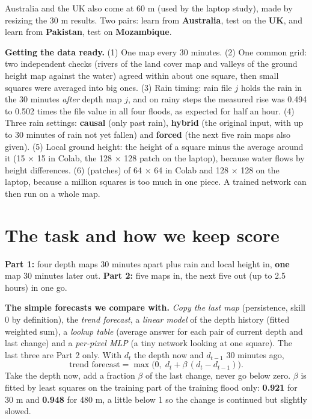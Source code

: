 Australia and the UK also come at 60 m (used by the laptop study), made by resizing the 30 m results. Two pairs: learn from \textbf{Australia}, test on the \textbf{UK}, and learn from \textbf{Pakistan}, test on \textbf{Mozambique}.

\textbf{Getting the data ready.} (1) One map every 30 minutes. (2) One common grid: two independent checks (rivers of the land cover map and valleys of the ground height map against the water) agreed within about one square, then small squares were averaged into big ones. (3) Rain timing: rain file $j$ holds the rain in the 30 minutes \emph{after} depth map $j$, and on rainy steps the measured rise was 0.494 to 0.502 times the file value in all four floods, as expected for half an hour. (4) Three rain settings: \textbf{causal} (only past rain), \textbf{hybrid} (the original input, with up to 30 minutes of rain not yet fallen) and \textbf{forced} (the next five rain maps also given). (5) Local ground height: the height of a square minus the average around it (15 $\times$ 15 in Colab, the 128 $\times$ 128 patch on the laptop), because water flows by height differences. (6)  (patches) of 64 $\times$ 64 in Colab and 128 $\times$ 128 on the laptop, because a million squares is too much in one piece. A trained network can then run on a whole map.

\section{The task and how we keep score}\label{ch:score}

\textbf{Part 1:} four depth maps 30 minutes apart plus rain and local height in, \textbf{one} map 30 minutes later out. \textbf{Part 2:} five maps in, the next five out (up to 2.5 hours) in one go.

\textbf{The simple forecasts we compare with.} \emph{Copy the last map} (persistence, skill 0 by definition), the \emph{trend forecast}, a \emph{linear model} of the depth history (fitted weighted sum), a \emph{lookup table} (average answer for each pair of current depth and last change) and a \emph{per-pixel MLP} (a tiny network looking at one square). The last three are Part 2 only. With $d_t$ the depth now and $d_{t-1}$ 30 minutes ago,
\[ \text{trend forecast} = \max\bigl(0,\; d_t + \beta\,(d_t - d_{t-1})\bigr). \]
Take the depth now, add a fraction $\beta$ of the last change, never go below zero. $\beta$ is fitted by least squares on the training part of the training flood only: \textbf{0.921} for 30 m and \textbf{0.948} for 480 m, a little below 1 so the change is continued but slightly slowed.

